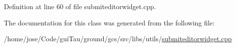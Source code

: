 Definition at line 60 of file submiteditorwidget.\-cpp.



The documentation for this class was generated from the following file\-:\begin{DoxyCompactItemize}
\item 
/home/jose/\-Code/gui\-Tau/ground/gcs/src/libs/utils/\hyperlink{submiteditorwidget_8cpp}{submiteditorwidget.\-cpp}\end{DoxyCompactItemize}
